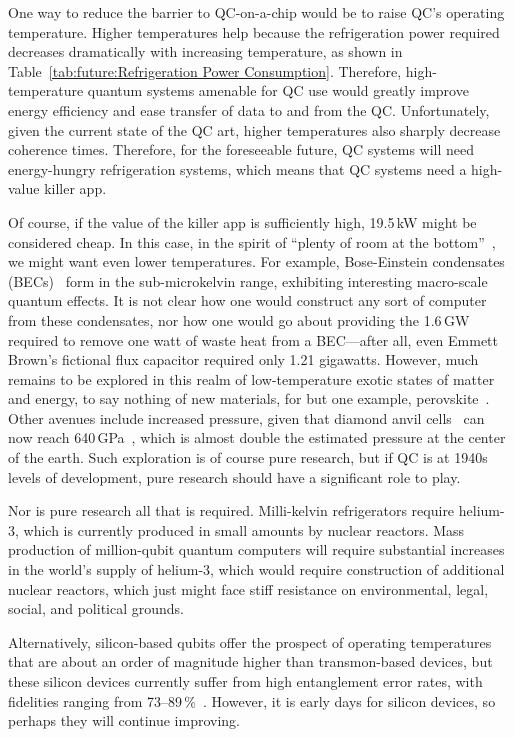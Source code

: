 One way to reduce the barrier to QC-on-a-chip would be to raise
QC's operating temperature.
Higher temperatures help because the refrigeration power required
decreases dramatically with increasing temperature, as shown in
Table~\ref{tab:future:Refrigeration Power Consumption}.
Therefore, high-temperature quantum systems amenable for QC use would
greatly improve energy efficiency and ease transfer of data to and from
the QC.
Unfortunately, given the current state of the QC art, higher
temperatures also sharply decrease coherence times.
Therefore, for the foreseeable future, QC systems will need
energy-hungry refrigeration systems, which means that QC
systems need a high-value killer app.

Of course, if the value of the killer app is sufficiently high,
19.5\,kW might be considered cheap.
In this case, in the spirit of
``plenty of room at the bottom''~\cite{RichardPFeynman1959RoomAtBottom},
we might want even lower temperatures.
For example, Bose-Einstein condensates
(BECs)~\cite{NIST2001BoseEinsteinCondensate}
form in the sub-microkelvin range, exhibiting interesting
macro-scale quantum effects.
It is not clear how one would construct any sort of computer from
these condensates, nor how one would go about providing the 1.6\,GW
required to remove one watt of waste heat from a BEC---after all,
even Emmett Brown's fictional flux capacitor required only 1.21 gigawatts.
However, much remains to be explored in this realm
of low-temperature exotic states of matter and energy, to say
nothing of new materials, for but one example,
perovskite~\cite{ZhengChen2016PerovskiteQDMOFthinFilm}.
Other avenues include increased pressure, given that diamond anvil
cells~\cite{Weir1959DiamondAnvilCell} can now reach
640\,GPa~\cite{LeonidDubrovinsky2012640GPaDiamondAnvilCell},
which is almost double the estimated pressure at the center of the earth.
Such exploration is of course pure research, but if QC is at 1940s levels
of development, pure research should have a significant role to play.

Nor is pure research all that is required.
Milli-kelvin refrigerators require helium-3, which is currently
produced in small amounts by nuclear reactors.
Mass production of million-qubit quantum computers will require
substantial increases in the world's supply of helium-3, which would
require construction of additional nuclear reactors, which just might face
stiff resistance on environmental, legal, social, and political grounds.

Alternatively, silicon-based qubits offer the prospect of
operating temperatures that are about an order of magnitude higher than
transmon-based devices, but these silicon devices currently suffer from
high entanglement error rates, with fidelities ranging from
73--89\,\%~\cite{TFWatson2017SiliconQubit}.
However, it is early days for silicon devices, so perhaps they will
continue improving.

